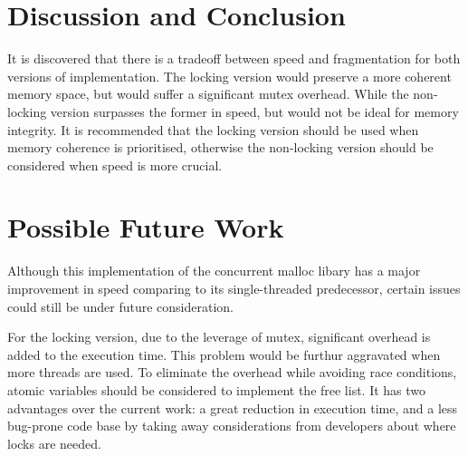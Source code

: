 \documentclass[12pt, letterpaper]{article}
\begin{document}
    \section*{Discussion and Conclusion}
      It is discovered that there is a tradeoff between speed and fragmentation for both versions of implementation.
      The locking version would preserve a more coherent memory space, but would suffer a significant mutex overhead.
      While the non-locking version surpasses the former in speed, but would not be ideal for memory integrity. 
      It is recommended that the locking version should be used when memory coherence is prioritised,
      otherwise the non-locking version should be considered when speed is more crucial. 

    \section*{Possible Future Work}
      Although this implementation of the concurrent malloc libary has a major improvement in speed 
      comparing to its single-threaded predecessor, certain issues could still be under future consideration.

      For the locking version, due to the leverage of mutex, significant overhead is added to the execution time.
      This problem would be furthur aggravated when more threads are used. 
      To eliminate the overhead while avoiding race conditions, atomic variables should be considered to implement the free list.
      It has two advantages over the current work: a great reduction in execution time, 
      and a less bug-prone code base by taking away considerations from developers about where locks are needed. 
\end{document}

